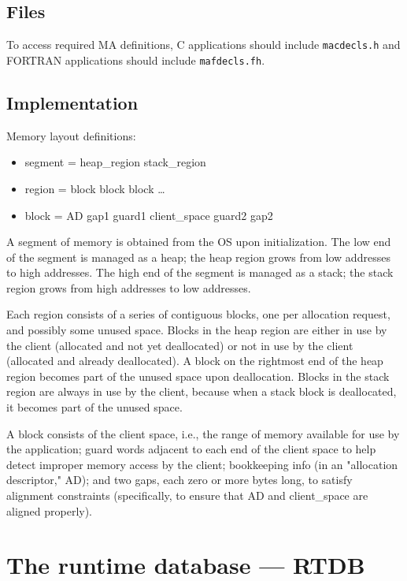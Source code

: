 \subsection{Files}

To access required MA definitions, C applications should include
{\tt macdecls.h} and FORTRAN applications should include
{\tt mafdecls.fh}.

\subsection{Implementation}

Memory layout definitions:
\begin{itemize}
\item segment = heap\_region stack\_region
\item region = block block block \ldots
\item block = AD gap1 guard1 client\_space guard2 gap2
\end{itemize}

A segment of memory is obtained from the OS upon initialization.  The
low end of the segment is managed as a heap; the heap region grows
from low addresses to high addresses.  The high end of the segment is
managed as a stack; the stack region grows from high addresses to low
addresses.

Each region consists of a series of contiguous blocks, one per
allocation request, and possibly some unused space.  Blocks in the
heap region are either in use by the client (allocated and not yet
deallocated) or not in use by the client (allocated and already
deallocated).  A block on the rightmost end of the heap region becomes
part of the unused space upon deallocation.  Blocks in the stack
region are always in use by the client, because when a stack block is
deallocated, it becomes part of the unused space.

A block consists of the client space, i.e., the range of memory
available for use by the application; guard words adjacent to each end
of the client space to help detect improper memory access by the
client; bookkeeping info (in an "allocation descriptor," AD); and two
gaps, each zero or more bytes long, to satisfy alignment constraints
(specifically, to ensure that AD and client\_space are aligned
properly).  


\section{The runtime database --- RTDB}

